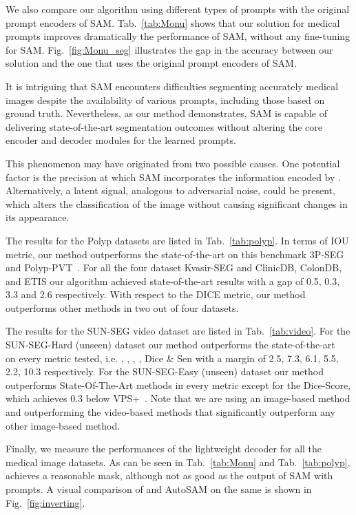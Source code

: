 \documentclass[runningheads]{llncs}
\begin{document}
We also compare our algorithm using different types of prompts with the original prompt encoders of SAM. Tab.~\ref{tab:Monu} shows that our solution for medical prompts improves dramatically the performance of SAM, without any fine-tuning for SAM. Fig.~\ref{fig:Monu_seg} illustrates the gap in the accuracy between our solution and the one that uses the original prompt encoders of SAM.

It is intriguing that SAM encounters difficulties segmenting accurately medical images despite the availability of various prompts, including those based on ground truth. Nevertheless, as our method demonstrates, SAM is capable of delivering state-of-the-art segmentation outcomes without altering the core encoder and decoder modules for the learned prompts.

This phenomenon may have originated from two possible causes. One potential factor is the precision at which SAM incorporates the information encoded by . Alternatively, a latent signal, analogous to adversarial noise, could be present, which alters the classification of the image without causing significant changes in its appearance.

The results for the Polyp datasets are listed in Tab.~\ref{tab:polyp}. In terms of IOU metric, our method outperforms the state-of-the-art on this benchmark 3P-SEG~\cite{shaharabany2022end} and Polyp-PVT~\cite{dong2021polyp}. For all the four dataset Kvasir-SEG and ClinicDB, ColonDB, and ETIS our algorithm achieved state-of-the-art results with a gap of 0.5, 0.3, 3.3 and 2.6 respectively. With respect to the DICE metric, our method outperforms other methods in two out of four datasets. 

The results for the SUN-SEG video dataset are listed in Tab.~\ref{tab:video}. For the SUN-SEG-Hard (unseen) dataset our method outperforms the state-of-the-art~\cite{ji2022video} on every metric tested, i.e.  ,  ,  ,  , Dice \& Sen with a margin of 2.5, 7.3, 6.1, 5.5, 2.2, 10.3 respectively. For the SUN-SEG-Easy (unseen) dataset our method outperforms State-Of-The-Art methods in every metric except for the Dice-Score, which achieves 0.3 below VPS+~\cite{ji2022video}. Note that we are using an image-based method and outperforming the video-based methods that significantly outperform any other image-based method. 


Finally, we measure the performances of the lightweight decoder  for all the medical image datasets. As can be seen in Tab.~\ref{tab:Monu} and 
Tab.~\ref{tab:polyp},  achieves a reasonable mask, although not as good as the output of SAM with  prompts. A visual comparison of  and AutoSAM on the same  is shown in Fig.~\ref{fig:inverting}.
\end{document}
